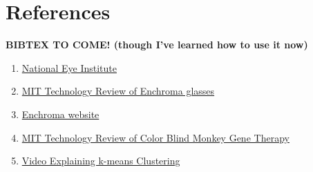 \documentclass[12pt]{article}
\begin{document}
\section{References}
\singlespacing
\textbf{BIBTEX TO COME! (though I've learned how to use it now)}
\begin{enumerate}
	\item 
		\href{https://nei.nih.gov/health/color_blindness/facts_about}{National Eye Institute}

	\item
		\href{https://www.technologyreview.com/s/601782/how-enchromas-glasses-correct-color-blindness/}{MIT Technology Review of Enchroma glasses}
	
	\item
		\href{http://enchroma.com/contact-us/}{Enchroma website}
		
	\item
		\href{https://www.technologyreview.com/s/415339/color-blind-monkeys-get-full-color-vision/}{MIT Technology Review of Color Blind Monkey Gene Therapy}
		
	\item
		\href{https://www.youtube.com/watch?v=IuRb3y8qKX4}{Video Explaining k-means Clustering}
		


\end{enumerate}
\end{document}
